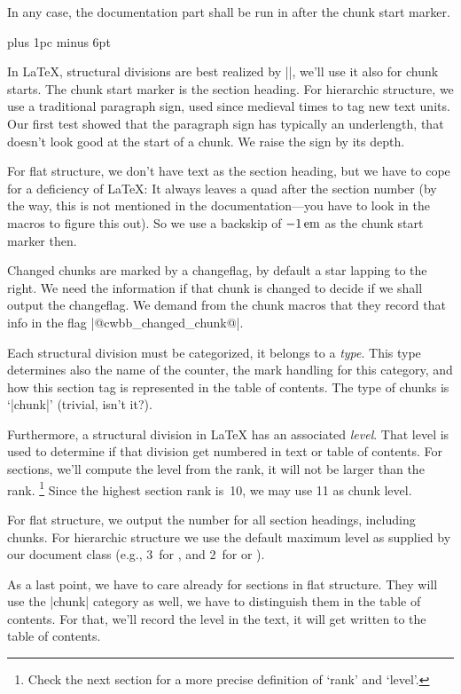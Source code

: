 \documentclass{progltx}
\begin{document}
In any case, the documentation part shall be run in after the chunk
start marker.

\beginprog
\newskip\CwebChunkPreSkip
	\CwebChunkPreSkip=2pc plus 1pc minus 6pt
\endprog


\sect In \LaTeX{}, structural divisions are best realized by
|\@startsection|, we'll use it also for chunk starts. The chunk start
marker is the section heading. For hierarchic structure, we use a
traditional paragraph sign, used since medieval times to tag new text
units. Our first test showed that the paragraph sign has typically an
underlength, that doesn't look good at the start of a chunk. We raise
the sign by its depth.

For flat structure, we don't have text as the section heading,
but we have to cope for a deficiency of \LaTeX{}: It always leaves a
quad after the section number (by the way, this is not mentioned in
the documentation---you have to look in the macros to figure this
out). So we use a backskip of $\rm -1\,em$ as the chunk start marker
then.

Changed chunks are marked by a changeflag, by default a star lapping
to the right. We need the information if that chunk is changed to
decide if we shall output the changeflag. We demand from the chunk
macros that they record that info in the flag |@cwbb_changed_chunk@|.

Each structural division must be categorized, it belongs to a
\textsl{type}. This type determines also the name of the counter, the
mark handling for this category, and how this section tag is
represented in the table of contents. The type of chunks is `|chunk|'
(trivial, isn't it?).

Furthermore, a structural division in \LaTeX{} has an associated
\textsl{level}. That level is used to determine if that division get
numbered in text or table of contents. For sections, we'll compute the
level from the rank, it will not be larger than the rank.%
    \footnote{Check the next section for a more precise definition of
	`rank' and `level'.}
Since the highest section rank is~10, we may use 11 as chunk level.

For flat structure, we output the number for all section headings,
including chunks. For hierarchic structure we use the default maximum
level as supplied by our document class (e.g., 3~for ,
and 2~for  or ).

As a last point, we have to care already for sections in flat
structure. They will use the |chunk| category as well, we have to
distinguish them in the table of contents. For that, we'll record the
level in the text, it will get written to the table of contents.
\end{document}
